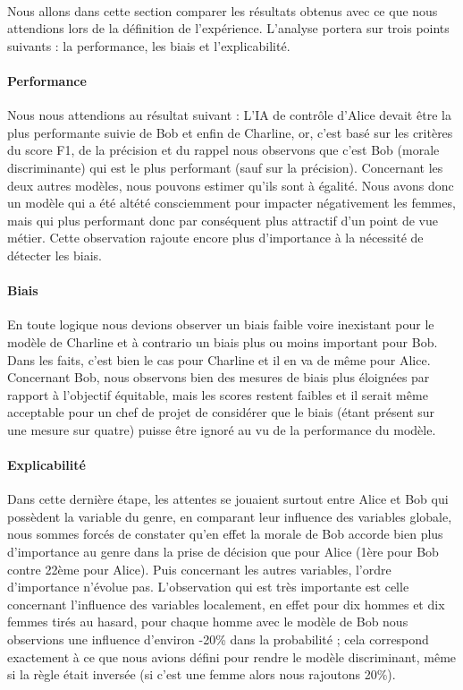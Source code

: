 \documentclass[10pt, french, a4paper]{report}
\begin{document}
\paragraph{}
Nous allons dans cette section comparer les résultats obtenus avec ce que nous attendions lors de la définition de l'expérience. L'analyse portera sur trois points suivants : la performance, les biais et l'explicabilité.

\paragraph{Performance} Nous nous attendions au résultat suivant : L'IA de contrôle d'Alice devait être la plus performante suivie de Bob et enfin de Charline, or, c'est basé sur les critères du score F1, de la précision et du rappel nous observons que c'est Bob (morale discriminante) qui est le plus performant (sauf sur la précision). Concernant les deux autres modèles, nous pouvons estimer qu'ils sont à égalité. Nous avons donc un modèle qui a été altété consciemment pour impacter négativement les femmes, mais qui plus performant donc par conséquent plus attractif d'un point de vue métier. Cette observation rajoute encore plus d'importance à la nécessité de détecter les biais.

\paragraph{Biais} En toute logique nous devions observer un biais faible voire inexistant pour le modèle de Charline et à contrario un biais plus ou moins important pour Bob. Dans les faits, c'est bien le cas pour Charline et il en va de même pour Alice. Concernant Bob, nous observons bien des mesures de biais plus éloignées par rapport à l'objectif équitable, mais les scores restent faibles et il serait même acceptable pour un chef de projet de considérer que le biais (étant présent sur une mesure sur quatre) puisse être ignoré au vu de la performance du modèle.

\paragraph{Explicabilité} Dans cette dernière étape, les attentes se jouaient surtout entre Alice et Bob qui possèdent la variable du genre, en comparant leur influence des variables globale, nous sommes forcés de constater qu'en effet la morale de Bob accorde bien plus d'importance au genre dans la prise de décision que pour Alice (1ère pour Bob contre 22ème pour Alice). Puis concernant les autres variables, l'ordre d'importance n'évolue pas. L'observation qui est très importante est celle concernant l'influence des variables localement, en effet pour dix hommes et dix femmes tirés au hasard, pour chaque homme avec le modèle de Bob nous observions une influence d'environ -20\% dans la probabilité ; cela correspond exactement à ce que nous avions défini pour rendre le modèle discriminant, même si la règle était inversée (si c'est une femme alors nous rajoutons 20\%).
\end{document}
